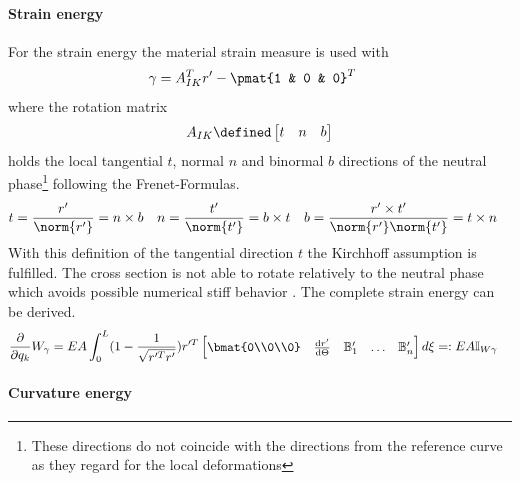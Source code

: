 \paragraph{Strain energy}
For the strain energy the material strain measure is used with
%
\begin{align}
  \gamma &= \AIK^T r' - \pmat{1 & 0 & 0}^T
\end{align}
%
where the rotation matrix
%
\begin{align}
  \AIK \defined
  \begin{bmatrix}
    t & n & b
  \end{bmatrix}
\end{align}
%
holds the local tangential $t$, normal $n$ and binormal $b$ directions of the neutral phase\footnote{These directions do not coincide with the directions from the reference curve as they regard for the local deformations} following the Frenet-Formulas.
%
\begin{align}
  t &= \frac{r'}{\norm{r'}} = n \times b
  &
  n &= \frac{t'}{\norm{t'}} = b \times t
  &
  b &= \frac{r' \times t'}{\norm{r'} \norm{t'}} = t \times n
\end{align}
%
With this definition of the tangential direction $t$ the Kirchhoff assumption is fulfilled.
The cross section is not able to rotate relatively to the neutral phase which avoids possible numerical stiff behavior \cite[Remark 3.4]{lang_multi-body_2011}.
The complete strain energy can be derived.
%
\begin{align*}
  \pdqk{} W _{\gamma} &=  EA \int _{0} ^{L}  (1 - \frac{1}{\sqrt{r'^Tr'}})   r'^T 
  \begin{bmatrix}
    \bmat{0\\0\\0} & \difdif{r'}{\Theta} & \msB'_1 & \ldots & \msB'_n
  \end{bmatrix} d \xi =: EA \msI _{W\gamma} 
\end{align*}
%
\paragraph{Curvature energy}

